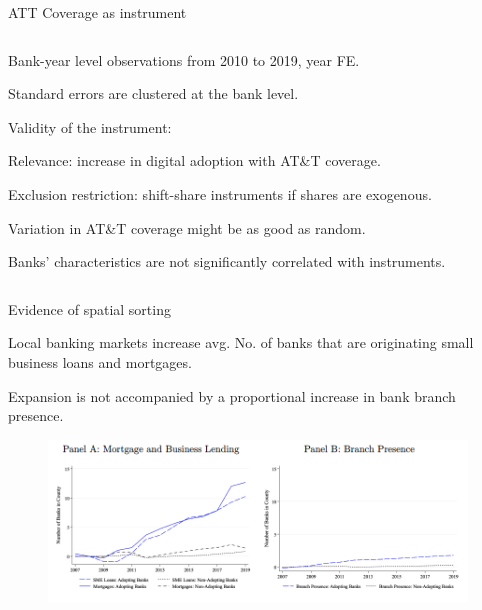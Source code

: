 \documentclass[notes,10pt, aspectratio=169]{beamer}
\newenvironment{wideitemize}{\itemize\addtolength{\itemsep}{10pt}}{\enditemize}
\begin{document}
\begin{frame}{ATT Coverage as instrument}
\begin{columns}[T]
\begin{column}{0.5\textwidth}
        \begin{wideitemize}
            \item Bank-year level observations from 2010 to 2019, year FE. 
            \item Standard errors are clustered at the bank level. 
            \item Validity of the instrument:
                \begin{wideitemize}
            \item Relevance: increase in digital adoption with AT\&T coverage.
            \item Exclusion restriction: shift-share instruments if shares are exogenous. 
            \item Variation in AT\&T coverage might be as good as random.
            \item Banks' characteristics are not significantly correlated with instruments. 
        \end{wideitemize}
    \end{wideitemize}
\end{column}
\end{columns}


\end{frame}

\begin{frame}{Evidence of spatial sorting}

    
        \begin{wideitemize}
            \item Local banking markets increase avg. No. of banks that are originating small business loans and mortgages.
            \item Expansion is not accompanied by a proportional increase in bank branch presence.
    \end{wideitemize}
    
    \begin{figure}
    \centering
    \includegraphics[width=0.99\textwidth]{imgs/fig5.png}
    \label{fig:my_label}
    \end{figure}
    
    \end{frame}
    
\end{document}
